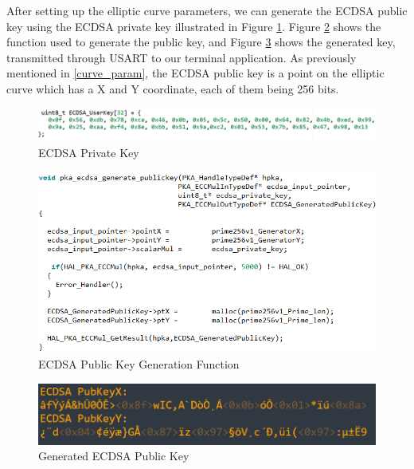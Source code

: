 After setting up the elliptic curve parameters, we can generate the ECDSA public key using the ECDSA private key illustrated in Figure \ref{fig:ecdsa_priv_key}. Figure \ref{fig:pka_ecdsa_generate} shows the function used to generate the public key, and Figure \ref{fig:pka_pubkey_terminal1} shows the generated key, transmitted through USART to our terminal application. As previously mentioned in \ref{curve_param}, the ECDSA public key is a point on the elliptic curve which has a X and Y coordinate, each of them being 256 bits.

\begin{figure}[H]
    \centering
    \includegraphics[width=18cm]{img/ecdsa priv key.png}
    \caption{ECDSA Private Key}
    \label{fig:ecdsa_priv_key}
\end{figure}


\begin{figure}[H]
    \centering
    \includegraphics[width=16cm]{img/pka_generate_ecdsa.png}
    \caption{ECDSA Public Key Generation Function}
    \label{fig:pka_ecdsa_generate}
\end{figure}





\begin{figure}[H]
    \centering
    \includegraphics[width=15cm]{img/ecdsa pubkey.png}
    \caption{Generated ECDSA Public Key}
    \label{fig:pka_pubkey_terminal1}
\end{figure}

